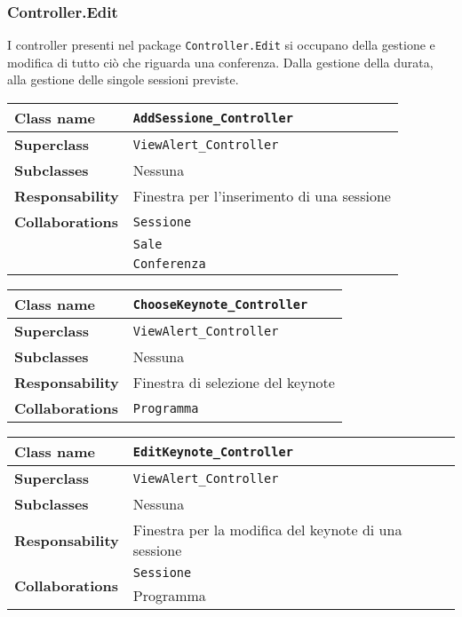\subsubsection{Controller.Edit}
I controller presenti nel package \texttt{Controller.Edit} si occupano della gestione e modifica di tutto ciò che riguarda una conferenza. Dalla gestione della durata, alla gestione delle singole sessioni previste.
\begin{table}[h!]
	\begin{tabular}{|l|l|}
		\hline 
		\textbf{Class name} & \texttt{AddSessione\_Controller}
		\\ \hline
		\textbf{Superclass} & \texttt{ViewAlert\_Controller}
		\\ \hline
		\multirow{1}{*}{\textbf{Subclasses}} & Nessuna
		\\ \hline
		\textbf{Responsability} & Finestra per l'inserimento di una sessione
		\\ \hline
		\multirow{1}{*}{\textbf{Collaborations}} & \texttt{Sessione} \\
		& \texttt{Sale} \\
		& \texttt{Conferenza} \\ \hline
	\end{tabular}
\end{table}
\begin{table}[h!]
	\begin{tabular}{|l|l|}
		\hline 
		\textbf{Class name} & \texttt{ChooseKeynote\_Controller}
		\\ \hline
		\textbf{Superclass} & \texttt{ViewAlert\_Controller}
		\\ \hline
		\multirow{1}{*}{\textbf{Subclasses}} & Nessuna
		\\ \hline
		\textbf{Responsability} & Finestra di selezione del keynote
		\\ \hline
		\multirow{1}{*}{\textbf{Collaborations}} & \texttt{Programma}
		\\ \hline
	\end{tabular}
\end{table}
\begin{table}[h!]
	\begin{tabular}{|l|l|}
		\hline 
		\textbf{Class name} & \texttt{EditKeynote\_Controller}
		\\ \hline
		\textbf{Superclass} & \texttt{ViewAlert\_Controller}
		\\ \hline
		\multirow{1}{*}{\textbf{Subclasses}} & Nessuna
		\\ \hline
		\textbf{Responsability} & Finestra per la modifica del keynote di una sessione
		\\ \hline
		\multirow{2}{*}{\textbf{Collaborations}} & \texttt{Sessione} \\
		& Programma \\ \hline
	\end{tabular}
\end{table}
